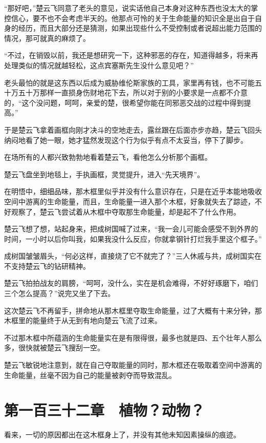 “那好吧，”楚云飞同意了老头的意见，说实话他自己本身对这种东西也没太大的掌控信心，要不也不会考虑半天的。他那点可怜的关于生命能量的知识全是出自于自身的经历，而且大部分还是猜测，如果出现些什么不受控制或者说超出能力范围的情况，那可就真的麻烦了。

“不过，在销毁以前，我还是想研究一下，这种邪恶的存在，知道得越多，将来再处理类似的情况就越轻松，这点宾塞斯先生没什么意见吧？”

老头最怕的就是这东西以后成为威胁维伦斯家族的工具，家里再有钱，也不可能五十万五十万那样一直损身伤财地花下去，所以对于别的小要求是一点都不介意的，“这个没问题，呵呵，亲爱的楚，很希望你能在同邪恶交战的过程中得到提高。”

于是楚云飞拿着画框向刚才决斗的空地走去，露丝跟在后面亦步亦趋，楚云飞回头纳闷地看了她一眼，她才猛然发现这个行为似乎有点不太妥当，停下了脚步。

在场所有的人都兴致勃勃地看着楚云飞，看他怎么分析那个画框。

楚云飞盘坐到地毯上，手执画框，灵觉提升，进入“先天境界”。

在明悟中，细细品味，那木框里似乎并没有什么意识存在，只是在近乎本能地吸收空间中游离的生命能量，而且，生命能量一进入那个木框，好象就失去了踪迹，不好观察了，楚云飞尝试着从木框中夺取那生命能量，却是起不了什么作用。

楚云飞想了想，站起身来，把成树国喊了过来，“我一会儿可能会感受不到外界的时间，一小时以后你叫我，如果我没什么反应，你就拿钢针打烂我手里这个框子。”

成树国皱皱眉头，“何必这样，直接烧了它不就完了？”三人休戚与共，成树国实在不支持楚云飞的钻研精神。

楚云飞拍拍战友的肩膀，“呵呵，没什么，实在是机会难得，不好好琢磨下，咱们三个怎么提高？”说完又坐了下去。

这次楚云飞不再留手，拼命地从那木框里夺取生命能量，过了大概有十来分钟，那木框里的能量终于从无到有地向楚云飞流了过来。

不过那木框中所蕴涵的生命能量实在是有限得很，最多也就是四、五个壮年人那么多，很快就被楚云飞搜刮一空。

楚云飞敏锐地注意到，就在自己夺取能量的同时，那木框还在吸取着空间中游离的生命能量，丝毫不因为自己的能量被剥夺而导致混乱。

\section{第一百三十二章　植物？动物？}

看来，一切的原因都出在这木框身上了，并没有其他未知因素操纵的痕迹。

